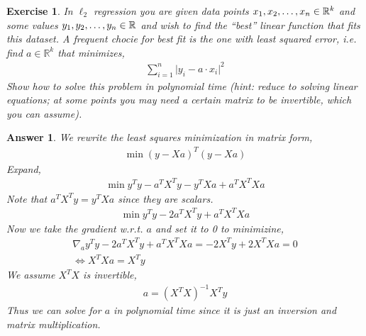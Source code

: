 \documentclass[12pt]{article}
\theoremstyle{colon}
\newtheorem{exercise}{Exercise}
\newtheorem*{answer}{Answer}
\begin{document}
\clearpage

\begin{exercise}
  In $\ell_2$ regression you are given data points $x_1, x_2, \mathellipsis, x_n \in \mathbb{R}^k$ and some values $y_1, y_2, \mathellipsis, y_n \in \mathbb{R}$ and wish to find the ``best'' linear function that fits this dataset. A frequent chocie for best fit is the one with \textit{least squared error}, i.e. find $a \in \mathbb{R}^k$ that minimizes,
  \begin{gather*}
    \sum_{i=1}^n \lvert y_i - a \cdot x_i \rvert^2
  \end{gather*}
  Show how to solve this problem in polynomial time (hint: reduce to solving linear equations; at some points you may need a certain matrix to be invertible, which you can assume).
\end{exercise}

\begin{answer}
  We rewrite the least squares minimization in matrix form,
  \begin{gather*}
    \min (y - X a)^T(y - X a)
  \end{gather*}
  Expand,
  \begin{gather*}
    \min y^T y - a^T X^T y - y^T X a +  a^T X^T X a
  \end{gather*}
  Note that $a^T X^T y = y^T X a$ since they are scalars.
  \begin{gather*}
    \min y^T y - 2 a^T X^T y +  a^T X^T X a
  \end{gather*}
  Now we take the gradient w.r.t. $a$ and set it to 0 to minimizine,
  \begin{gather*}
    \nabla_a y^T y - 2 a^T X^T y +  a^T X^T X a = - 2 X^T y + 2 X^T X a = 0 \\
    \Longleftrightarrow X^T X a  = X^T y
  \end{gather*}
  We assume $X^T X$ is invertible,
  \begin{gather*}
    a  = (X^T X)^{-1} X^T y
  \end{gather*}
  Thus we can solve for $a$ in polynomial time since it is just an inversion and matrix multiplication.
\end{answer}

\clearpage
\end{document}
